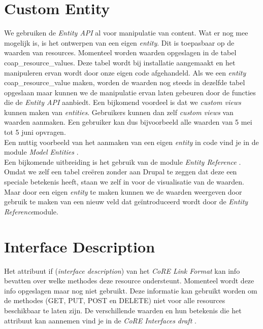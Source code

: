 \section{Custom Entity} \label{customEntity}
We gebruiken de \textit{Entity API} al voor manipulatie van content. Wat er nog mee mogelijk is, is het ontwerpen van een eigen \textit{entity}. Dit is toepasbaar op de waarden van resources. Momenteel worden waarden opgeslagen in de tabel coap\_resource\_values. Deze tabel wordt bij installatie aangemaakt en het manipuleren ervan wordt door onze eigen code afgehandeld. Als we een \textit{entity} coap\_resource\_value maken, worden de waarden nog steeds in dezelfde tabel opgeslaan maar kunnen we de manipulatie ervan laten gebeuren door de functies die de \textit{Entity API} aanbiedt. Een bijkomend voordeel is dat we \textit{custom views} kunnen maken van \textit{entities}. Gebruikers kunnen dan zelf \textit{custom views} van waarden aanmaken. Een gebruiker kan dus bijvoorbeeld alle waarden van 5 mei tot 5 juni opvragen.\\
Een nuttig voorbeeld van het aanmaken van een eigen \textit{entity} in code vind je in de module \textit{Model Entities} \cite{modelEntities}.\\

Een bijkomende uitbreiding is het gebruik van de module \textit{Entity Reference} \cite{entityReference}. Omdat we zelf een tabel cre\"{e}ren zonder aan Drupal te zeggen dat deze een speciale betekenis heeft, staan we zelf in voor de visualisatie van de waarden. Maar door een eigen \textit{entity} te maken kunnen we de waarden weergeven door gebruik te maken van een nieuw veld dat ge\"{i}ntroduceerd wordt door de \textit{Entity Reference}module.

\section{Interface Description}
Het attribuut if (\textit{interface description}) van het \textit{CoRE Link Format} kan info bevatten over welke methodes deze resource ondersteunt. Momenteel wordt deze info opgeslagen maar nog niet gebruikt. Deze informatie kan gebruikt worden om de methodes (GET, PUT, POST en DELETE) niet voor alle resources beschikbaar te laten zijn. De verschillende waarden en hun betekenis die het attribuut kan aannemen vind je in de \textit{CoRE Interfaces draft} \cite{coreInterfaces}.

